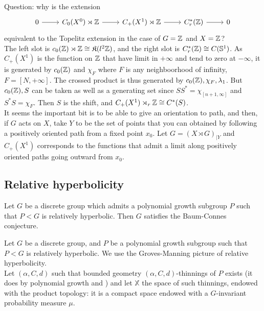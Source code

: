 Question: why is the extension 
\[\begin{tikzcd} 0 \arrow{r} & C_0(X^0)\rtimes \Z \arrow{r}& C_+(X^1)\rtimes \Z \arrow{r} & C^*_r(\Z) \arrow{r}& 0 \end{tikzcd}\]
equivalent to the Topelitz extension in the case of $G=\mathbb Z$ and $X = \mathbb Z$?\\

The left slot is $c_0(\mathbb Z)\rtimes \mathbb Z \cong \mathfrak K(l^2\mathbb Z)$, and the right slot is $C^*_r(\mathbb Z)\cong C(\mathbb S^1)$. As $C_+(X^1)$ is the function on $\mathbb Z$ that have limit in $+\infty$ and tend to zero at $-\infty$, it is generated by $c_0(\mathbb Z)$ and $\chi_F$ where $F$ is any neighboorhood of infinity, $F=[N,+\infty]$. The crossed product is thus generated by $c_0(\mathbb Z), \chi_F, \lambda_1$. But $c_0(\mathbb Z), S$ can be taken as well as a generating set since $SS^* = \chi_{[n+1,\infty]}$ and $S^*S =\chi_F$. Then $S$ is the shift, and $C_+(X^1)\rtimes_r \mathbb Z\cong C^*(S)$.\\

It seems the important bit is to be able to give an orientation to path, and then, if $G$ acts on $X$, take $Y$ to be the set of points that you can obtained by following a positively oriented path from a fixed point $x_0$. Let $G= (X\rtimes G)_{|Y}$ and $C_+(X^1)$ corresponds to the functions that admit a limit along positively oriented paths going outward from $x_0$.\\ 

\subsection{Relative hyperbolicity}

\begin{prop} Let $G$ be a discrete group which admits a polynomial growth subgroup $P$ such that $P<G$ is relatively hyperbolic. Then $G$ satisfies the Baum-Connes conjecture.
\end{prop}

Let $G$ be a discrete group, and $P$ be a polynomial growth subgroup such that $P<G$ is relatively hyperbolic. We use the Groves-Manning picture of relative hyperbolicity. \\

Let $(\alpha, C,d)$ such that bounded geometry $(\alpha, C ,d )$-thinnings of $P$ exists (it does by polynomial growth and \cite{guentnerproper}) and let $\mathbb X$ the space of such thinnings, endowed with the product topology: it is a compact space endowed with a $G$-invariant probability measure $\mu$.\\

